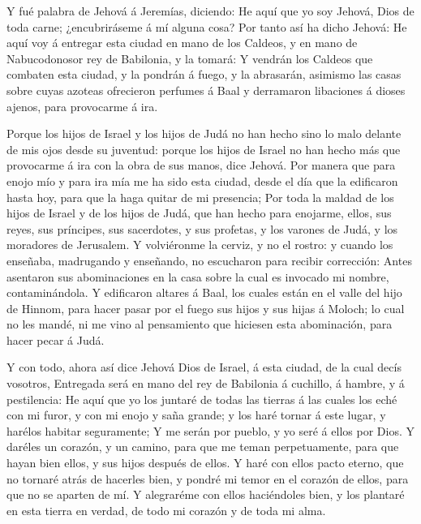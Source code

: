  Y fué palabra de Jehová á Jeremías, diciendo:
 He aquí que yo soy Jehová, Dios de toda carne;
¿encubriráseme á mí alguna cosa?  Por tanto así ha dicho
Jehová: He aquí voy á entregar esta ciudad en mano de los Caldeos, y en
mano de Nabucodonosor rey de Babilonia, y la tomará:  Y
vendrán los Caldeos que combaten esta ciudad, y la pondrán á fuego, y la
abrasarán, asimismo las casas sobre cuyas azoteas ofrecieron perfumes á
Baal y derramaron libaciones á dioses ajenos, para provocarme á ira.

 Porque los hijos de Israel y los hijos de Judá no han
hecho sino lo malo delante de mis ojos desde su juventud: porque los
hijos de Israel no han hecho más que provocarme á ira con la obra de sus
manos, dice Jehová.  Por manera que para enojo mío y para
ira mía me ha sido esta ciudad, desde el día que la edificaron hasta
hoy, para que la haga quitar de mi presencia;  Por toda la
maldad de los hijos de Israel y de los hijos de Judá, que han hecho para
enojarme, ellos, sus reyes, sus príncipes, sus sacerdotes, y sus
profetas, y los varones de Judá, y los moradores de Jerusalem.
 Y volviéronme la cerviz, y no el rostro: y cuando los
enseñaba, madrugando y enseñando, no escucharon para recibir corrección:
 Antes asentaron sus abominaciones en la casa sobre la cual
es invocado mi nombre, contaminándola.  Y edificaron
altares á Baal, los cuales están en el valle del hijo de Hinnom, para
hacer pasar por el fuego sus hijos y sus hijas á Moloch; lo cual no les
mandé, ni me vino al pensamiento que hiciesen esta abominación, para
hacer pecar á Judá.

 Y con todo, ahora así dice Jehová Dios de Israel, á esta
ciudad, de la cual decís vosotros, Entregada será en mano del rey de
Babilonia á cuchillo, á hambre, y á pestilencia:  He aquí
que yo los juntaré de todas las tierras á las cuales los eché con mi
furor, y con mi enojo y saña grande; y los haré tornar á este lugar, y
harélos habitar seguramente;  Y me serán por pueblo, y yo
seré á ellos por Dios.  Y daréles un corazón, y un camino,
para que me teman perpetuamente, para que hayan bien ellos, y sus hijos
después de ellos.  Y haré con ellos pacto eterno, que no
tornaré atrás de hacerles bien, y pondré mi temor en el corazón de
ellos, para que no se aparten de mí.  Y alegraréme con
ellos haciéndoles bien, y los plantaré en esta tierra en verdad, de todo
mi corazón y de toda mi alma.

